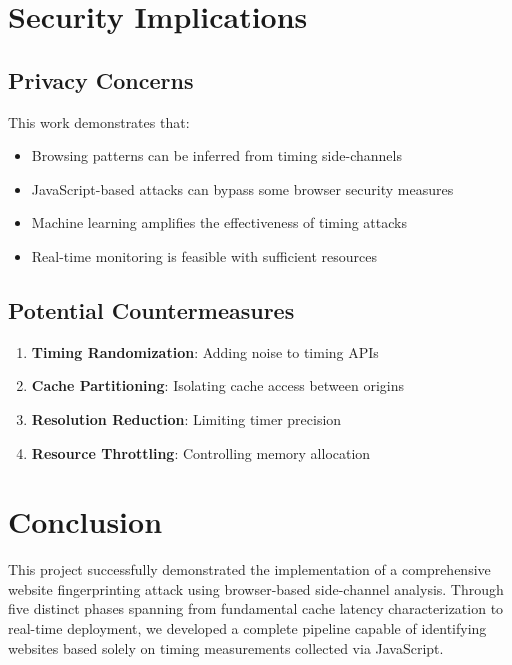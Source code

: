 \documentclass[11pt,a4paper]{article}
\begin{document}
\section{Security Implications}

\subsection{Privacy Concerns}
This work demonstrates that:
\begin{itemize}
    \item Browsing patterns can be inferred from timing side-channels
    \item JavaScript-based attacks can bypass some browser security measures
    \item Machine learning amplifies the effectiveness of timing attacks
    \item Real-time monitoring is feasible with sufficient resources
\end{itemize}

\subsection{Potential Countermeasures}
\begin{enumerate}
    \item \textbf{Timing Randomization}: Adding noise to timing APIs
    \item \textbf{Cache Partitioning}: Isolating cache access between origins
    \item \textbf{Resolution Reduction}: Limiting timer precision
    \item \textbf{Resource Throttling}: Controlling memory allocation
\end{enumerate}

\section{Conclusion}

This project successfully demonstrated the implementation of a comprehensive website fingerprinting attack using browser-based side-channel analysis. Through five distinct phases spanning from fundamental cache latency characterization to real-time deployment, we developed a complete pipeline capable of identifying websites based solely on timing measurements collected via JavaScript.
\end{document}
